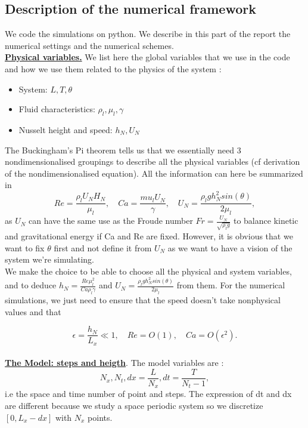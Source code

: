 \documentclass[12pt]{article}
\begin{document}
 \subsection{Description of the numerical framework}
We code the simulations on python. We describe in this part of the report the numerical settings and the numerical schemes.
\\

\underline{\textbf{Physical variables.}}
 We list here the global variables that we use in the code and how we use them related to the physics of the system :

\begin{itemize}
    \item System: $L,T,\theta$
    \item Fluid characteristics: $\rho_l, \mu_l, \gamma$
    \item Nusselt height and speed: $h_N, U_N$ 
\end{itemize}


The Buckingham's Pi theorem tells us that we essentially need 3 nondimensionalised groupings to describe all the
 physical variables (cf derivation of the nondimensionalised equation). All the information can here be summarized
  in $$Re = \frac{\rho_l U_N H_N}{\mu_l}, \quad Ca=\frac{mu_l U_N}{\gamma}, \quad U_N=\frac{\rho_l g h_N^2 sin(\theta)}{2\mu_l},$$
   as $U_N$ can have the same use as the Froude number $Fr = \frac{U_N}{\sqrt{\rho_l g}}$ to balance kinetic and gravitational 
   energy if Ca and Re are fixed. However, it is obvious that we want to fix $\theta$ first and not define it from $U_N$ as we 
   want to have a vision of the system we're simulating. 
\\

We make the choice to be able to choose all the physical and system variables, and to deduce 
$h_N = \frac{Re \mu_l^2}{Ca\rho_l \gamma}$ and $U_N = \frac{\rho_l g h_N^2 sin(\theta)}{2\mu_l}$ from them. For the numerical simulations, 
we just need to ensure that the speed doesn't take nonphysical values and that 

\begin{equation}\label{num_scaling_conditions}
\epsilon = \frac{h_N}{L_x} \ll 1, \quad Re=O(1),\quad Ca=O(\epsilon^2).
\end{equation}
\\

\underline{\textbf{The Model: steps and heigth}}. The model variables are : 
\begin{equation}
    N_x, N_t, dx = \frac{L}{N_x}, dt=\frac{T}{N_t -1},
\end{equation}
i.e the space and time number of point and steps. The expression of dt and dx are different 
because we study a space periodic system so we discretize $[0, L_x-dx]$ with $N_x$ points.  
\end{document}
